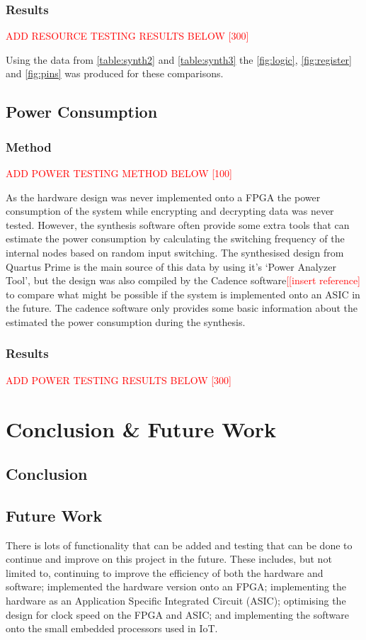 \documentclass[12pt,twoside,a4paper]{report}
\begin{document}
	\subsection{Results}
	\textcolor{red}{ADD RESOURCE TESTING RESULTS BELOW [300]}
	
	Using the data from \autoref{table:synth2} and \autoref{table:synth3} the \autoref{fig:logic}, \ref{fig:register} and \ref{fig:pins} was produced for these comparisons.  
	
	\section{Power Consumption}
	
	\subsection{Method}
	\textcolor{red}{ADD POWER TESTING METHOD BELOW [100]}
	
	As the hardware design was never implemented onto a FPGA the power consumption of the system while encrypting and decrypting data was never tested. However, the synthesis software often provide some extra tools that can estimate the power consumption by calculating the switching frequency of the internal nodes based on random input switching. The synthesised design from Quartus Prime is the main source of this data by using it's `Power Analyzer Tool', but the design was also compiled by the Cadence software\textcolor{red}{[[insert reference]} to compare what might be possible if the system is implemented onto an ASIC in the future.  The cadence software only provides some basic information about the estimated  the power consumption during the synthesis.
	
	\subsection{Results}
	\textcolor{red}{ADD POWER TESTING RESULTS BELOW [300]}

	\chapter{Conclusion \& Future Work}
	\label{chapter:CONC}
	
	\section{Conclusion}
	
	\section{Future Work}
	There is lots of functionality that can be added and testing that can be done to continue and improve on this project in the future. These includes, but not limited to, continuing to improve the efficiency of both the hardware and software; implemented the hardware version onto an FPGA; implementing the hardware as an Application Specific Integrated Circuit (ASIC); optimising the design for clock speed on the FPGA and ASIC; and implementing the software onto the small embedded processors used in IoT.
	
\end{document}
